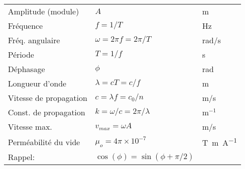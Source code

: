 \raggedright

\begin{tabular}{lll}
Amplitude (module) & $A$ & m\\
Fréquence & $f = 1/T$ & Hz\\
Fréq. angulaire & $\omega = 2\pi f = 2\pi/T$ & rad/s\\
Période & $T=1/f$ & s\\
Déphasage & $\phi$ & rad\\
Longueur d'onde & \(\lambda = cT = c/f\) & m \\%
Vitesse de propagation & \(c=\lambda f =c_0/n\) & m/s \\%
Const. de propagation & \(k = \omega/c = 2\pi/\lambda\)& m$^{-1}$\\
Vitesse max. & \( v_{\textit{max}}=\omega A\) & m/s\\%
Perméabilité du vide & \(\mu_o=4\pi\times 10^{-7}\)& \si{\tesla\meter\per\ampere}\\
\hfill Rappel: & $\cos(\phi)=\sin(\phi + \pi/2)$ &
\end{tabular}


